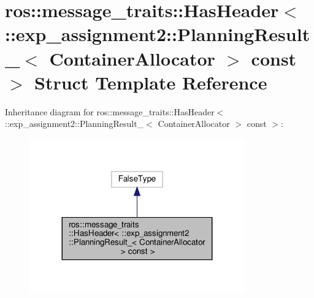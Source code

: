 \hypertarget{structros_1_1message__traits_1_1HasHeader_3_01_1_1exp__assignment2_1_1PlanningResult___3_01ContainerAllocator_01_4_01const_01_4}{}\section{ros\+:\+:message\+\_\+traits\+:\+:Has\+Header$<$ \+:\+:exp\+\_\+assignment2\+:\+:Planning\+Result\+\_\+$<$ Container\+Allocator $>$ const $>$ Struct Template Reference}
\label{structros_1_1message__traits_1_1HasHeader_3_01_1_1exp__assignment2_1_1PlanningResult___3_01ContainerAllocator_01_4_01const_01_4}


Inheritance diagram for ros\+:\+:message\+\_\+traits\+:\+:Has\+Header$<$ \+:\+:exp\+\_\+assignment2\+:\+:Planning\+Result\+\_\+$<$ Container\+Allocator $>$ const $>$\+:
\nopagebreak
\begin{figure}[H]
\begin{center}
\leavevmode
\includegraphics[width=263pt]{structros_1_1message__traits_1_1HasHeader_3_01_1_1exp__assignment2_1_1PlanningResult___3_01Contaf8c64555afd8815c5569bd0e40f119e8}
\end{center}
\end{figure}


